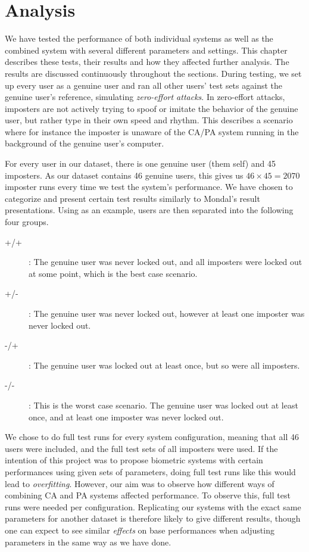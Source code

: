\chapter{Analysis}
\label{chap:analysis}
We have tested the performance of both individual systems as well as the combined system with several different parameters and settings.
This chapter describes these tests, their results and how they affected further analysis.
The results are discussed continuously throughout the sections.
During testing, we set up every user as a genuine user and ran all other users' test sets against the genuine user's reference, simulating \textit{zero-effort attacks}.
In zero-effort attacks, imposters are not actively trying to spoof or imitate the behavior of the genuine user, but rather type in their own speed and rhythm.
This describes a scenario where for instance the imposter is unaware of the CA/PA system running in the background of the genuine user's computer.

For every user in our dataset, there is one genuine user (them self) and 45 imposters.
As our dataset contains 46 genuine users, this gives us $46 \times 45 = 2070$ imposter runs every time we test the system's performance.
We have chosen to categorize and present certain test results similarly to Mondal's \cite{mondal} result presentations.
Using  as an example, users are then separated into the following four groups.
\begin{description}
    \item [+/+]: The genuine user was never locked out, and all imposters were locked out at some point, which is the best case scenario.
    \item [+/-]: The genuine user was never locked out, however at least one imposter was never locked out.
    \item [-/+]: The genuine user was locked out at least once, but so were all imposters.
    \item [-/-]: This is the worst case scenario. The genuine user was locked out at least once, and at least one imposter was never locked out.
\end{description}

We chose to do full test runs for every system configuration, meaning that all 46 users were included, and the full test sets of all imposters were used.
If the intention of this project was to propose biometric systems with certain performances using given sets of parameters, doing full test runs like this would lead to \textit{overfitting}.
However, our aim was to observe how different ways of combining CA and PA systems affected performance.
To observe this, full test runs were needed per configuration.
Replicating our systems with the exact same parameters for another dataset is therefore likely to give different results, though one can expect to see similar \textit{effects} on base performances when adjusting parameters in the same way as we have done.

